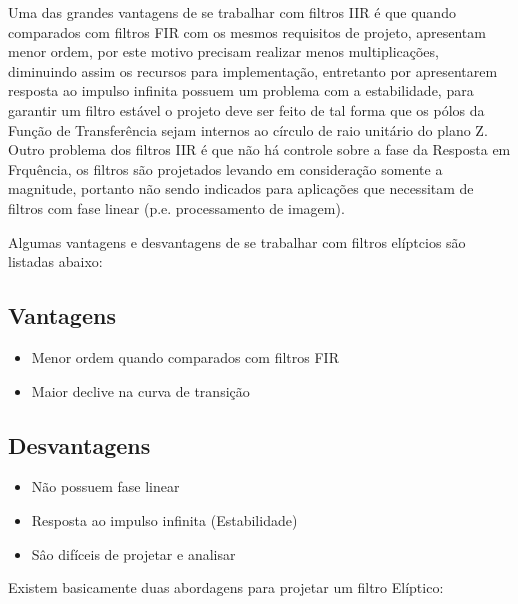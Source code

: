 \documentclass[a4paper,10pt]{article}
\begin{document}
Uma das grandes vantagens de se trabalhar com filtros IIR é que quando comparados com filtros FIR com os mesmos requisitos de projeto, apresentam menor ordem, por este motivo precisam realizar menos multiplicações, diminuindo assim os recursos para implementação, entretanto por apresentarem resposta ao impulso infinita possuem um problema com a estabilidade, para garantir um filtro estável o projeto deve ser feito de tal forma que os pólos da Função de Transferência  sejam internos ao círculo de raio unitário do plano Z. Outro problema dos filtros IIR é que não há controle sobre a fase da Resposta em Frquência, os filtros são projetados levando em consideração somente a magnitude, portanto não sendo indicados para aplicações que necessitam de filtros com fase linear (p.e. processamento de imagem).

Algumas vantagens e desvantagens de se trabalhar com filtros elíptcios são listadas abaixo:

\subsection{Vantagens}

	\begin{itemize}
		\item Menor ordem quando comparados com filtros FIR
		\item Maior declive na curva de transição
	\end{itemize}


\subsection{Desvantagens}

	\begin{itemize}
		\item Não possuem fase linear
		\item Resposta ao impulso infinita (Estabilidade)
		\item Sâo difíceis de projetar e analisar
	\end{itemize}


Existem basicamente duas abordagens para projetar um filtro Elíptico:
\end{document}
